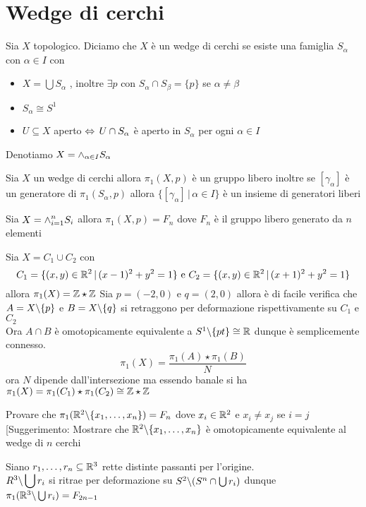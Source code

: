 \section{Wedge di cerchi}
\begin{defn} Sia $X$ topologico. Diciamo che $X$ \`e un wedge di cerchi se esiste una famiglia $S_\alpha$ con $\alpha\in I$ con 
\begin{itemize}
\item $X=\bigcup S_\alpha$ , inoltre $\exists p $ con $S_\alpha\cap S_\beta = \{ p \} $ se $\alpha\neq \beta$
\item $S_\alpha\cong S^1$
\item $U \subseteq	 X $ aperto $\Leftrightarrow \, U \cap S_\alpha$ \`e aperto in $S_\alpha$ per ogni $\alpha\in I $
\end{itemize}
Denotiamo $X=\displaystyle \wedge_{\alpha\in I } S_\alpha$
\end{defn}
\begin{prop}Sia $X$ un wedge di cerchi allora $\pi_1(X,p)$ \`e un gruppo libero inoltre se $[\gamma_\alpha]$ \`e un generatore di $\pi_1(S_\alpha, p)$ allora $\{ [\gamma_\alpha]\, \vert \, \alpha\in I \} $ \`e un insieme di generatori liberi 
\end{prop}
\begin{cor}
Sia $X=\displaystyle \wedge_{i=1}^n S_i $ allora $\pi_1(X,p)=F_n$ dove $F_n$ \`e il gruppo libero generato da $n$ elementi
\end{cor} 
\begin{ese} Sia $X= C_1 \cup C_2$ con 
$$C_1 = \{ (x,y)\in \mathbb{R}^2\, \vert \, (x-1)^2+ y^2=1\}\text{ e } C_2=\{ (x,y) \in \mathbb{R}^2 \, \vert \, (x+1)^2 +y^2=1\}$$
allora $\pi_1(X)= \mathbb{Z} \star \mathbb{Z}$
\proof Sia $p=(-2,0)$ e $q=(2,0)$ allora \`e di facile verifica che $A=X\backslash\{ p\}$ e $B=X \backslash\{ q\}$ si retraggono per deformazione rispettivamente  su $C_1$ e $C_2$\\
Ora $A\cap B$ \`e omotopicamente equivalente a $S^1 \backslash \{ pt\}\cong\mathbb{R}$ dunque \`e semplicemente connesso.
$$ \pi_1(X)= \frac{\pi_1(A)\star \pi_1(B)}{N}$$ 
ora $N$ dipende dall'intersezione ma essendo banale si ha $\pi_1(X)=\pi_1(C_1)\star \pi_1(C_2)\cong \mathbb{Z}\star \mathbb{Z}$
\end{ese}
\begin{ex}
Provare che $\pi_1(\mathbb{R}^2 \backslash \{x_1, \dots , x_n\})
=F_n$ dove $x_i\in \mathbb{R}^2 $ e $x_i \neq x_j$ 
se $i=j$ 
[Suggerimento: Mostrare che $\mathbb{R}^2 \backslash \{x_1, \dots , x_n\}$ 	\`e omotopicamente equivalente al wedge di $n$ cerchi
\end{ex}
\begin{ex}Siano $r_1, \dots, r_n \subseteq \mathbb{R}^3$ rette distinte passanti per l'origine.\\
$R^3\backslash \displaystyle \bigcup r_i$ si ritrae per deformazione su $S^2 \backslash (S^n \cap \bigcup r_i)$ dunque $\pi_1 ( \mathbb{R}^3\backslash \bigcup r_i) = F_{2n-1}$
\end{ex}
